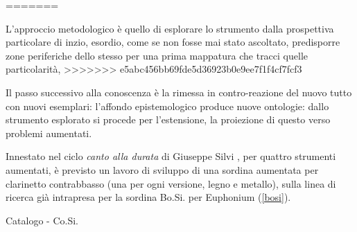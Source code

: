 \documentclass{gs-adonis}
\begin{document}

=======

%

L'approccio metodologico è quello di esplorare lo strumento dalla prospettiva
particolare di inzio, esordio, come se non fosse mai stato ascoltato,
predisporre zone periferiche dello stesso per una prima mappatura che tracci
quelle particolarità,
>>>>>>> e5abc456bb69fde5d36923b0e9ee7f1f4cf7fcf3




Il passo successivo alla conoscenza è la rimessa in contro-reazione del nuovo
tutto con nuovi esemplari: l'affondo epistemologico produce nuove ontologie:
dallo strumento esplorato si procede per l'estensione, la proiezione di questo
verso problemi aumentati.

Innestato nel ciclo \emph{canto alla durata} di Giuseppe Silvi
\cite{gs:cad, gs:artQ13}, per quattro strumenti aumentati, è previsto un lavoro
di sviluppo di una sordina aumentata per clarinetto contrabbasso (una per ogni
versione, legno e metallo), sulla linea di ricerca già intrapresa per la sordina
Bo.Si. per Euphonium (\ref{bosi}).

\begin{description}
  \item[Catalogo - Co.Si.]
\end{description}
\end{document}
